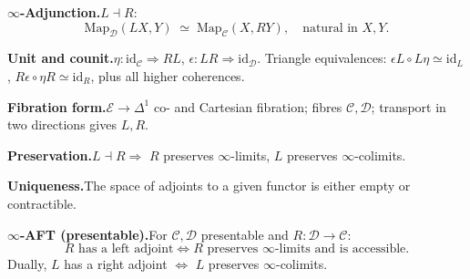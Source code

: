 \begin{formalrestatement}
\textbf{$\infty$-Adjunction.}\quad $L \dashv R$:
\begin{equation*}
  \mathrm{Map}_\mathcal{D}(LX, Y) \;\simeq\; \mathrm{Map}_\mathcal{C}(X, RY),
  \quad \text{natural in } X, Y.
\end{equation*}

\medskip
\textbf{Unit and counit.}\quad $\eta : \mathrm{id}_\mathcal{C} \Rightarrow RL$,
$\epsilon : LR \Rightarrow \mathrm{id}_\mathcal{D}$. Triangle equivalences:
$\epsilon L \circ L\eta \simeq \mathrm{id}_L$, $R\epsilon \circ \eta R \simeq \mathrm{id}_R$,
plus all higher coherences.

\medskip
\textbf{Fibration form.}\quad $\mathcal{E} \to \Delta^1$ co- and Cartesian
fibration; fibres $\mathcal{C}, \mathcal{D}$; transport in two directions
gives $L, R$.

\medskip
\textbf{Preservation.}\quad $L \dashv R \Rightarrow$ $R$ preserves
$\infty$-limits, $L$ preserves $\infty$-colimits.

\medskip
\textbf{Uniqueness.}\quad The space of adjoints to a given functor is
either empty or contractible.

\medskip
\textbf{$\infty$-AFT (presentable).}\quad For $\mathcal{C}, \mathcal{D}$
presentable and $R : \mathcal{D} \to \mathcal{C}$:
\begin{equation*}
  R \text{ has a left adjoint} \iff R \text{ preserves } \infty\text{-limits and is accessible}.
\end{equation*}
Dually, $L$ has a right adjoint $\iff$ $L$ preserves $\infty$-colimits.
\end{formalrestatement}
